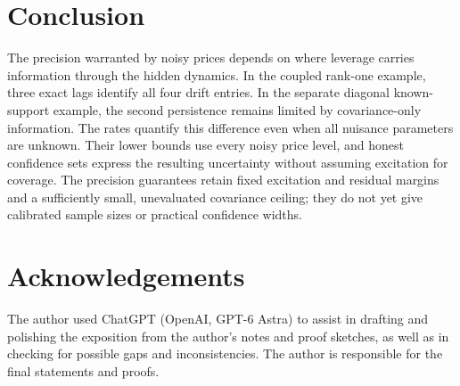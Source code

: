 \documentclass[11pt,a4paper]{amsart}
\theoremstyle{plain}
\theoremstyle{definition}
\theoremstyle{remark}
\begin{document}
\section{Conclusion}

The precision warranted by noisy prices depends on where leverage carries
information through the hidden dynamics. In the coupled rank-one example,
three exact lags identify all four drift entries. In the separate diagonal
known-support example, the second persistence remains limited by
covariance-only information. The rates quantify this difference even when
all nuisance parameters are unknown. Their lower bounds use every noisy
price level, and honest confidence sets express the resulting uncertainty
without assuming excitation for coverage. The precision guarantees retain
fixed excitation and residual margins and a sufficiently small,
unevaluated covariance ceiling; they do not yet give calibrated sample
sizes or practical confidence widths.

\section*{Acknowledgements}

The author used ChatGPT (OpenAI, GPT-6 Astra) to assist in drafting and
polishing the exposition from the author's notes and proof sketches, as well
as in checking for possible gaps and inconsistencies. The author is
responsible for the final statements and proofs.
\end{document}
